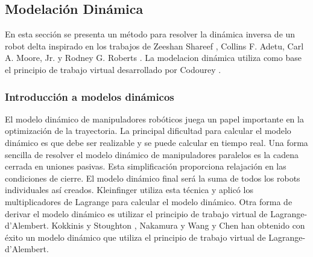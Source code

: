         


        








    \newpage

    \subsection{Modelación Dinámica}\label{cap4_mb_subsection_dina}
    
        En esta sección se presenta un método para resolver la dinámica inversa de un robot delta inspirado en los trabajos de Zeeshan Shareef \cite{Path_Planning_and_Trajectory_Optimization}, Collins F. Adetu, Carl A. Moore, Jr. y Rodney G. Roberts \cite{dynamic_omega3}. La modelacion dinámica utiliza como base el principio de trabajo virtual desarrollado por Codourey \cite{Codourey_decoupling}.

 
        
        \subsubsection{Introducción a modelos dinámicos}
    
        El modelo dinámico de manipuladores robóticos juega un papel importante en la optimización de la trayectoria. La principal dificultad para calcular el modelo dinámico es que debe ser realizable y se puede calcular en tiempo real. Una forma sencilla de resolver el modelo dinámico de manipuladores paralelos es la cadena cerrada en uniones pasivas. Esta simplificación proporciona relajación en las condiciones de cierre. El modelo dinámico final será la suma de todos los robots individuales así creados. Kleinfinger \cite{kleinfinger1986modelisation} utiliza esta técnica y aplicó los multiplicadores de Lagrange para calcular el modelo dinámico. Otra forma de derivar el modelo dinámico es utilizar el principio de trabajo virtual de Lagrange-d’Alembert. Kokkinis y Stoughton \cite{kokkinis1991dynamics}, Nakamura \cite{NakamuraYoshihiko1991Ar} y Wang y Chen \cite{wang1994dynamic} han obtenido con éxito un modelo dinámico que utiliza el principio de trabajo virtual de Lagrange-d’Alembert.
        
